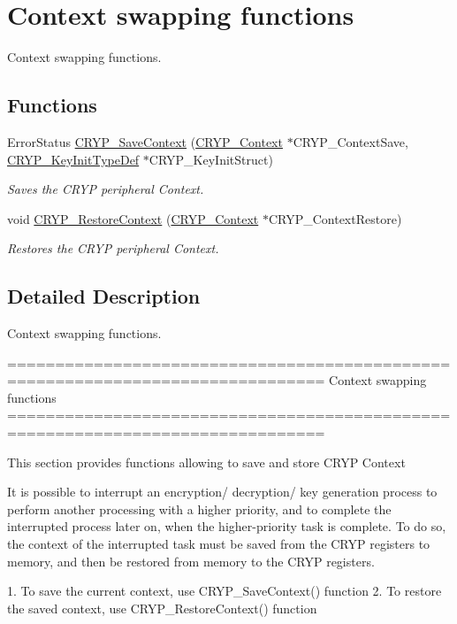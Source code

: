 \hypertarget{group___c_r_y_p___group3}{\section{Context swapping functions}
\label{group___c_r_y_p___group3}
}


Context swapping functions.  


\subsection*{Functions}
\begin{DoxyCompactItemize}
\item 
Error\-Status \hyperlink{group___c_r_y_p___group3_ga41a14be7fa43d500e7c94cce40910ea8}{C\-R\-Y\-P\-\_\-\-Save\-Context} (\hyperlink{struct_c_r_y_p___context}{C\-R\-Y\-P\-\_\-\-Context} $\ast$C\-R\-Y\-P\-\_\-\-Context\-Save, \hyperlink{struct_c_r_y_p___key_init_type_def}{C\-R\-Y\-P\-\_\-\-Key\-Init\-Type\-Def} $\ast$C\-R\-Y\-P\-\_\-\-Key\-Init\-Struct)
\begin{DoxyCompactList}\small\item\em Saves the C\-R\-Y\-P peripheral Context. \end{DoxyCompactList}\item 
void \hyperlink{group___c_r_y_p___group3_gaf2986782fa66ea95b2a389595e17e0e5}{C\-R\-Y\-P\-\_\-\-Restore\-Context} (\hyperlink{struct_c_r_y_p___context}{C\-R\-Y\-P\-\_\-\-Context} $\ast$C\-R\-Y\-P\-\_\-\-Context\-Restore)
\begin{DoxyCompactList}\small\item\em Restores the C\-R\-Y\-P peripheral Context. \end{DoxyCompactList}\end{DoxyCompactItemize}


\subsection{Detailed Description}
Context swapping functions. \begin{DoxyVerb} ===============================================================================
                             Context swapping functions
 ===============================================================================  

  This section provides functions allowing to save and store CRYP Context

  It is possible to interrupt an encryption/ decryption/ key generation process 
  to perform another processing with a higher priority, and to complete the 
  interrupted process later on, when the higher-priority task is complete. To do 
  so, the context of the interrupted task must be saved from the CRYP registers 
  to memory, and then be restored from memory to the CRYP registers.
   
  1. To save the current context, use CRYP_SaveContext() function
  2. To restore the saved context, use CRYP_RestoreContext() function \end{DoxyVerb}
 

